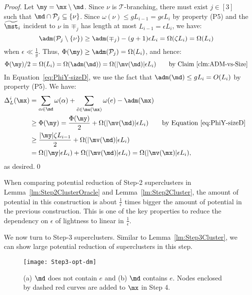 \begin{proof}
	Let $\my = \mx\setminus \md$. Since $\nu$ is $\mathcal{T}$-branching, there must exist $j \in [3]$ such that $\md\cap \mathcal{P}_j \subseteq \{\nu\}$. Since $\omega(\nu)\leq g L_{i-1} = g\epsilon L_i$ by property (P5) and the $\widetilde{\mst}_i$ incident to $\nu$ in $\mp_j$ has length at most $L_{i-1} = \epsilon L_i$, we have:
	\begin{equation*}
	\adm(\mathcal{P}_j\setminus \{\nu\}) \geq \adm(\mp_j) - (g+1)\epsilon L_i = \Omega(\zeta L_i) = \Omega(L_i)
	\end{equation*}
	when $\epsilon \ll \frac{1}{g}$. Thus, $\Phi(\my)\geq \adm(\mathcal{P}_j) = \Omega(L_i)$, and hence:
	\begin{equation}\label{eq:PhiY-sizeD}
	\Phi(\my)/2 = \Omega(L_i) = \Omega(\adm(\md)) = \Omega(|\mv(\md)|\epsilon L_i) \qquad \mbox{by Claim~\ref{clm:ADM-vs-Size}}
	\end{equation}
	In Equation~\eqref{eq:PhiY-sizeD}, we use the fact that $\adm(\md) \leq gL_i =  O(L_i)$ by property (P5). We have:
	\begin{equation*}
	\begin{split}
	\Delta^i_L(\mx) &=  \sum_{\alpha \in \md}\omega(\alpha) + \sum_{\tilde{e} \in \me(\mx)} \omega(e) - \adm(\mx)\\
	&\geq \Phi(\my)  =  \frac{\Phi(\my)}{2} +\Omega(|\mv(\md)|\epsilon L_i) \qquad \mbox{by Equation~\eqref{eq:PhiY-sizeD} }\\
	&\geq  \frac{|\my| \zeta L_{i-1}}{2} +\Omega(|\mv(\md)|\epsilon L_i)\\
	&= \Omega(|\my| \epsilon L_i) +\Omega(|\mv(\md)|\epsilon L_i) = \Omega(|\mv(\mx)|\epsilon L_i),
	\end{split}
	\end{equation*} 
	as desired.\qed
\end{proof}

When comparing potential reduction of Step-2 superclusters in Lemma~\ref{lm:Step2ClusterOracle} and Lemma~\ref{lm:Step2Cluster}, the amount of potential in this construction is about $\frac{1}{\epsilon}$ times bigger the amount of potential in the previous construction. This is one of the key properties to reduce the dependency on $\epsilon$ of lightness to linear in $\frac{1}{\epsilon}$.

\noindent We now turn to Step-3 superclusters. Similar to Lemma~\ref{lm:Step3Cluster}, we can show large potential reduction of superclusters in this step.

 \begin{wrapfigure}{r}{0.4\textwidth}
	\vspace{-35pt}
	\begin{center}
		\texttt{[image: Step3-opt-dm]}
	\end{center}
	\caption{\footnotesize{(a) $\md$ does not contain $e$ and (b) $\md$ contains $e$. Nodes enclosed by dashed red curves are added to $\mx$ in Step 4.}}
	\vspace{-10pt}
	\label{fig:Step3-opt-dm}
\end{wrapfigure}

